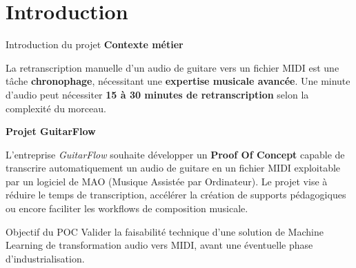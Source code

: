 \section{Introduction}

\begin{frame}{Introduction du projet}
    \textbf{Contexte métier}
    
    La retranscription manuelle d'un audio de guitare vers un fichier MIDI est une tâche \textbf{chronophage}, nécessitant une \textbf{expertise musicale avancée}.
    Une minute d'audio peut nécessiter \textbf{15 à 30 minutes de retranscription} selon la complexité du morceau.

    \vspace{0.4cm}

    \textbf{Projet GuitarFlow}
    
    L'entreprise \textit{GuitarFlow} souhaite développer un \textbf{Proof Of Concept} capable de transcrire automatiquement un audio de guitare en un fichier MIDI exploitable par un logiciel de MAO (Musique Assistée par Ordinateur).
    \newline
	Le projet vise à réduire le temps de transcription, accélérer la création de supports pédagogiques ou encore faciliter les workflows de composition musicale.

	\vspace{0.2cm}

    \begin{block}{Objectif du POC}
    	Valider la faisabilité technique d'une solution de Machine Learning de transformation audio vers MIDI, avant une éventuelle phase d'industrialisation.
    \end{block}
\end{frame}
